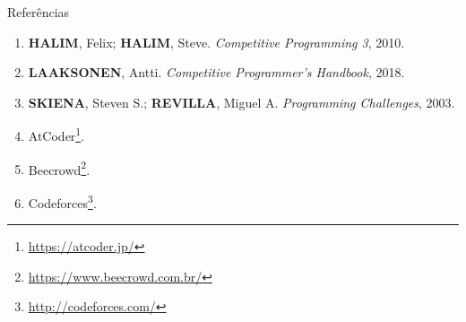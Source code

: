 \begin{frame}[fragile]{Referências}

    \begin{enumerate}
        \item \textbf{HALIM}, Felix; \textbf{HALIM}, Steve. \textit{Competitive Programming 3}, 2010.
        \item \textbf{LAAKSONEN}, Antti. \textit{Competitive Programmer's Handbook}, 2018.

        \item \textbf{SKIENA}, Steven S.; \textbf{REVILLA}, Miguel A. \textit{Programming
            Challenges}, 2003.

        \item AtCoder\footnote{\url{https://atcoder.jp/}}.

        \item Beecrowd\footnote{\url{https://www.beecrowd.com.br/}}.

        \item Codeforces\footnote{\url{http://codeforces.com/}}.
    \end{enumerate}

\end{frame}
